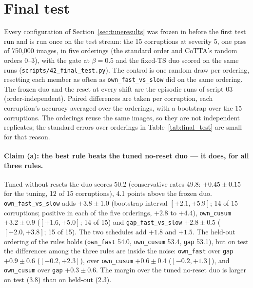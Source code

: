 \documentclass[10pt]{article}
\newcommand{\rl}[1]{\texttt{#1}}
\begin{document}


\section{Final test}\label{sec:final}
Every configuration of Section~\ref{sec:tuneresults} was frozen in  before the first test run and is run once on the test stream: the 15 corruptions at severity 5, one pass of 750,000 images, in five orderings (the standard order and CoTTA's random orders 0--3), with the gate at $\beta = 0.5$ and the fixed-TS duo scored on the same runs (\rl{scripts/42\_final\_test.py}). The control is one random draw per ordering, resetting each member as often as \rl{own\_fast\_vs\_slow} did on the same ordering. The frozen duo and the reset at every shift are the episodic runs of script 03 (order-independent). Paired differences are taken per corruption, each corruption's accuracy averaged over the orderings, with a bootstrap over the 15 corruptions. The orderings reuse the same images, so they are not independent replicates; the standard errors over orderings in Table~\ref{tab:final_test} are small for that reason.




\paragraph{Claim (a): the best rule beats the tuned no-reset duo --- it does, for all three rules.} Tuned without resets the duo scores 50.2 (conservative rates 49.8: $+0.45 \pm 0.15$ for the tuning, 12 of 15 corruptions), 4.1 points above the frozen duo. \rl{own\_fast\_vs\_slow} adds $+3.8 \pm 1.0$ (bootstrap interval $[+2.1, +5.9]$; 14 of 15 corruptions; positive in each of the five orderings, $+2.8$ to $+4.4$), \rl{own\_cusum} $+3.2 \pm 0.9$ ($[+1.6, +5.0]$; 14 of 15) and \rl{gap\_fast\_vs\_slow} $+2.8 \pm 0.5$ ($[+2.0, +3.8]$; 15 of 15). The two schedules add $+1.8$ and $+1.5$. The held-out ordering of the rules holds (\rl{own\_fast} 54.0, \rl{own\_cusum} 53.4, \rl{gap} 53.1), but on test the differences among the three rules are inside the noise: \rl{own\_fast} over \rl{gap} $+0.9 \pm 0.6$ ($[-0.2, +2.3]$), over \rl{own\_cusum} $+0.6 \pm 0.4$ ($[-0.2, +1.3]$), and \rl{own\_cusum} over \rl{gap} $+0.3 \pm 0.6$. The margin over the tuned no-reset duo is larger on test (3.8) than on held-out (2.3).
\end{document}
